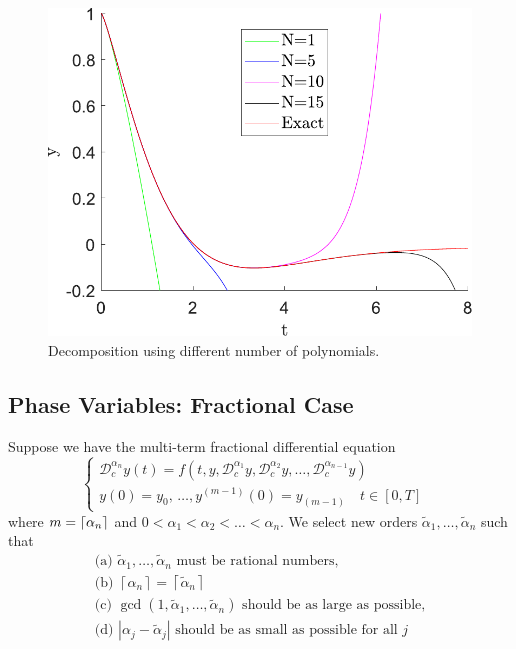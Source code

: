 \begin{figure}[H]
    \centering
    \includegraphics[scale=0.5]{files/frac_deco.pdf}
    \caption{Decomposition using different number of polynomials.}
    \label{fig:deco_frac}
\end{figure}

\subsection{Phase Variables: Fractional Case}
Suppose we have the multi-term fractional differential equation
\begin{equation}
    \begin{cases}
    \mathcal{D}_c^{\alpha_n}y(t)=f\left(t,y,\mathcal{D}_c^{\alpha_1}y,\mathcal{D}_c^{\alpha_2}y,\dots,\mathcal{D}_c^{\alpha_{n-1}}y\right)&\\
    y(0)=y_0,\,\dots,y^{(m-1)}(0)= y_{(m-1)}\quad t\in[0,T]
    \end{cases}
\end{equation}
    where $m=\lceil\alpha_n\rceil$ and $0<\alpha_{1}<\alpha_{2}<\ldots<\alpha_{n}$. We select new orders $\tilde{\alpha}_{1}, \ldots, \tilde{\alpha}_{n}$ such that
    \[\begin{array}{l}{\text { (a) } \tilde{\alpha}_{1}, \ldots, \tilde{\alpha}_{n} \text { must be rational numbers, }} \\ {\text { (b) }\left\lceil\alpha_{n}\right\rceil=\left\lceil\tilde{\alpha}_{n}\right\rceil} \\ {\text { (c) } \operatorname{gcd}\left(1, \tilde{\alpha}_{1}, \ldots, \tilde{\alpha}_{n}\right) \text { should be as large as possible, }} \\ {\text { (d) }\left|\alpha_{j}-\tilde{\alpha}_{j}\right| \text { should be as small as possible for all } j}\end{array}\]


